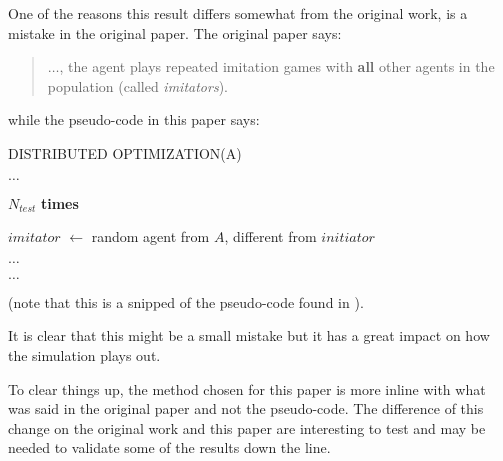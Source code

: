 One of the reasons this result differs somewhat from the original work, is a mistake in the original paper.
The original paper says:
\begin{quotation}
    $\dots$, the agent plays repeated imitation games with \textbf{all} other agents in the population (called \textit{imitators}). 
\end{quotation}
while the pseudo-code in this paper says:

\begin{algorithm}
    \caption{DISTRIBUTED OPTIMIZATION(A)}
    \begin{algorithmic}

        \State $\dots$
        \State 

        \Loop $N_{test}$ \textbf{times}

            \State $imitator$ $\leftarrow$ random agent from $A$, different from $initiator$

            \State $\dots$
        \EndLoop

        \State
        \State $\dots$
        
    \end{algorithmic}
\end{algorithm}

(note that this is a snipped of the pseudo-code found in \citep*{de2010multi}).

It is clear that this might be a small mistake but it has a great impact on how the simulation plays out.

To clear things up, the method chosen for this paper is more inline with what was said in the original paper and not the pseudo-code.
The difference of this change on the original work and this paper are interesting to test and may be needed to validate some of the results down the line.

